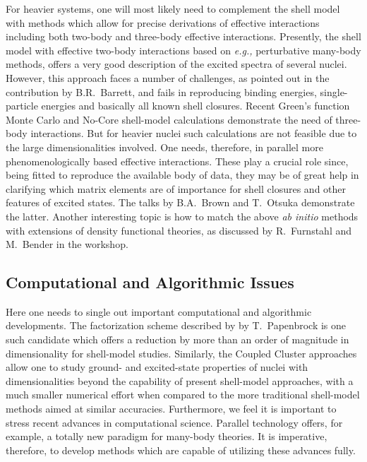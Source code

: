 \documentclass[12pt]{iopart}
\begin{document}
For heavier systems, one will most likely need to 
complement the shell model with methods which allow 
for precise derivations of effective
interactions including both two-body and three-body effective interactions.
Presently, the  shell model with effective two-body interactions based on 
{\it e.g.,} perturbative many-body methods,
offers a very good description of the 
excited spectra of several nuclei.  However, this approach faces 
a number of challenges, as pointed out in the
contribution by B.R.~Barrett, and fails in reproducing 
binding energies, single-particle energies and basically  
all known shell closures. Recent Green's function Monte Carlo 
and No-Core shell-model 
calculations demonstrate the need of three-body 
interactions.  But for heavier nuclei
such calculations are not feasible due to the 
large dimensionalities involved.
One needs, therefore, in parallel more phenomenologically based 
effective interactions. These play a crucial role
since, being fitted to reproduce the available body of data, 
they may be of great help in clarifying
which matrix elements are of importance for shell 
closures and other features of 
excited states.   The talks by B.A.~Brown and T.~Otsuka 
demonstrate the latter. 
Another interesting topic is how to match the 
above {\it ab initio} methods with extensions
of density functional theories, as discussed by R.~Furnstahl and M.~Bender
in the workshop. 

\subsection{Computational and Algorithmic Issues}

Here one needs to single out important computational and 
algorithmic developments.  The factorization scheme described by
by T.~Papenbrock is one such candidate
which offers a reduction by more than an order of magnitude in dimensionality 
for shell-model studies. Similarly, the Coupled Cluster approaches
allow one to study ground- and excited-state properties of nuclei
with dimensionalities beyond the capability of present shell-model
approaches, with a much smaller numerical effort when compared to
the more traditional shell-model methods aimed at similar accuracies.
Furthermore, we feel it is important to stress recent advances 
in computational science.
Parallel technology offers, for example, a totally new paradigm
for many-body theories. It is imperative, therefore, 
to develop methods which are capable
of utilizing these advances fully.  
\end{document}
